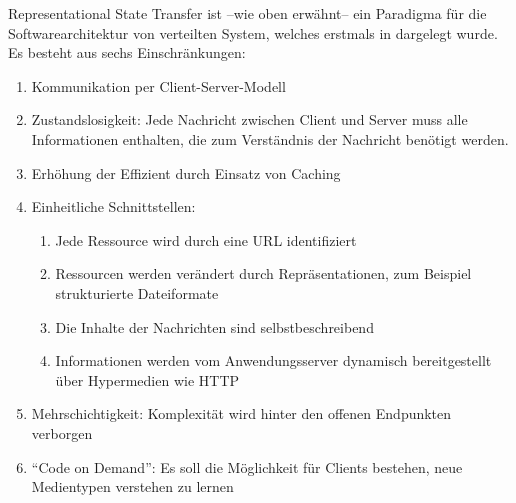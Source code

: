 \begin{comment}
Schweregrad, Klinischer Status (gesichert/Verdacht)

Observation Durchgefihrte Messung (zB. Klinisehe Chemie, Fieber, Diagnostik
Puls, Blutdruck), Messergebnis, verwendetes Geri,
Zeitpunkt der Messung, Normbereich

 

Chargtiem erbrache Leising, Unfan, ZipunkVZsivaum, Anahi, | Abrechoung
s, Zu-/Abschkig
‘AuditEvent zion = Duco, ‘Art und Umfang des Zugriffes, | Sicherheit

 

ire-Komponenten bzw. Benutzer
ResearchSubject Nevtnupfong ces die,
Zaire ee etinchos,zugewicocerStudicaaen, ets

Einwilligungen

    

Forschung


\end{comment}

\label{rest-paradigm}

Representational State Transfer ist --wie oben erwähnt-- ein Paradigma für die Softwarearchitektur von verteilten System, welches erstmals in \cite{rest-fielding} dargelegt wurde. Es besteht aus sechs Einschränkungen: 

\begin{enumerate}
\item Kommunikation per Client-Server-Modell
\item Zustandslosigkeit: Jede Nachricht zwischen Client und Server muss alle Informationen enthalten, die zum Verständnis der Nachricht benötigt werden. 
\item Erhöhung der Effizient durch Einsatz von Caching
\item Einheitliche Schnittstellen: 
\begin{enumerate}
\item Jede Ressource wird durch eine URL identifiziert
\item Ressourcen werden verändert durch Repräsentationen, zum Beispiel strukturierte Dateiformate
\item Die Inhalte der Nachrichten sind selbstbeschreibend
\item Informationen werden vom Anwendungsserver dynamisch bereitgestellt über Hypermedien wie HTTP
\end{enumerate}
\item Mehrschichtigkeit: Komplexität wird hinter den offenen Endpunkten verborgen 
\item "`Code on Demand"': Es soll die Möglichkeit für Clients bestehen, neue Medientypen verstehen zu lernen
\end{enumerate}

